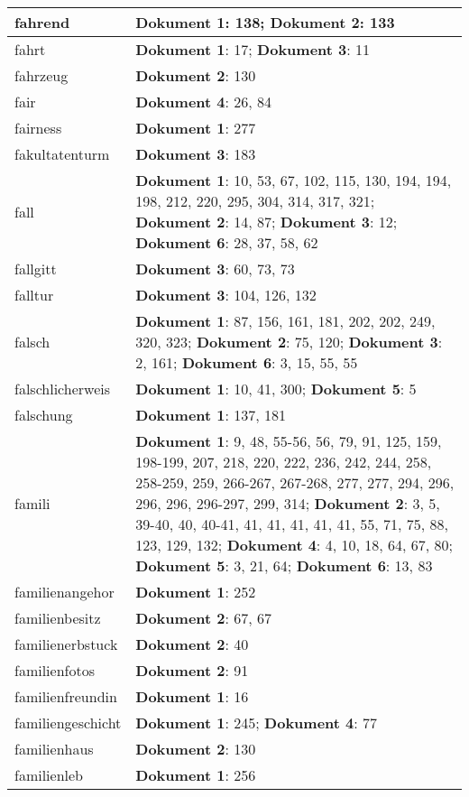 \documentclass[a5paper]{article}
\begin{document}
\begin{longtable}[l]{|l|p{3in}|}
\hline
fahrend & \textbf{Dokument 1}: 138; \textbf{Dokument 2}: 133 \\
\hline
fahrt & \textbf{Dokument 1}: 17; \textbf{Dokument 3}: 11 \\
\hline
fahrzeug & \textbf{Dokument 2}: 130 \\
\hline
fair & \textbf{Dokument 4}: 26, 84 \\
\hline
fairness & \textbf{Dokument 1}: 277 \\
\hline
fakultatenturm & \textbf{Dokument 3}: 183 \\
\hline
fall & \textbf{Dokument 1}: 10, 53, 67, 102, 115, 130, 194, 194, 198, 212, 220, 295, 304, 314, 317, 321; \textbf{Dokument 2}: 14, 87; \textbf{Dokument 3}: 12; \textbf{Dokument 6}: 28, 37, 58, 62 \\
\hline
fallgitt & \textbf{Dokument 3}: 60, 73, 73 \\
\hline
falltur & \textbf{Dokument 3}: 104, 126, 132 \\
\hline
falsch & \textbf{Dokument 1}: 87, 156, 161, 181, 202, 202, 249, 320, 323; \textbf{Dokument 2}: 75, 120; \textbf{Dokument 3}: 2, 161; \textbf{Dokument 6}: 3, 15, 55, 55 \\
\hline
falschlicherweis & \textbf{Dokument 1}: 10, 41, 300; \textbf{Dokument 5}: 5 \\
\hline
falschung & \textbf{Dokument 1}: 137, 181 \\
\hline
famili & \textbf{Dokument 1}: 9, 48, 55-56, 56, 79, 91, 125, 159, 198-199, 207, 218, 220, 222, 236, 242, 244, 258, 258-259, 259, 266-267, 267-268, 277, 277, 294, 296, 296, 296, 296-297, 299, 314; \textbf{Dokument 2}: 3, 5, 39-40, 40, 40-41, 41, 41, 41, 41, 41, 55, 71, 75, 88, 123, 129, 132; \textbf{Dokument 4}: 4, 10, 18, 64, 67, 80; \textbf{Dokument 5}: 3, 21, 64; \textbf{Dokument 6}: 13, 83 \\
\hline
familienangehor & \textbf{Dokument 1}: 252 \\
\hline
familienbesitz & \textbf{Dokument 2}: 67, 67 \\
\hline
familienerbstuck & \textbf{Dokument 2}: 40 \\
\hline
familienfotos & \textbf{Dokument 2}: 91 \\
\hline
familienfreundin & \textbf{Dokument 1}: 16 \\
\hline
familiengeschicht & \textbf{Dokument 1}: 245; \textbf{Dokument 4}: 77 \\
\hline
familienhaus & \textbf{Dokument 2}: 130 \\
\hline
familienleb & \textbf{Dokument 1}: 256 \\

\end{longtable}
\end{document}
